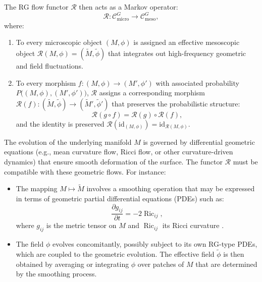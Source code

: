 The RG flow functor \(\mathcal{R}\) then acts as a Markov operator:
\[
\mathcal{R}: \mathcal{C}_{\text{micro}}^G \to \mathcal{C}_{\text{meso}}^G,
\]
where:
\begin{enumerate}[label=(\alph*)]
	\item To every microscopic object \((M, \phi)\) is assigned an effective mesoscopic object \(\mathcal{R}(M, \phi) = (\widetilde{M}, \widetilde{\phi})\) that integrates out high-frequency geometric and field fluctuations.
	\item To every morphism \(f: (M, \phi) \to (M', \phi')\) with associated probability \(P\big((M, \phi), (M', \phi')\big)\), \(\mathcal{R}\) assigns a corresponding morphism \(\mathcal{R}(f): (\widetilde{M}, \widetilde{\phi}) \to (\widetilde{M}', \widetilde{\phi}')\) that preserves the probabilistic structure:
	\[
	\mathcal{R}(g \circ f) = \mathcal{R}(g) \circ \mathcal{R}(f),
	\]
	and the identity is preserved \(\mathcal{R}(\mathrm{id}_{(M, \phi)}) = \mathrm{id}_{\mathcal{R}(M, \phi)}\).
\end{enumerate}

The evolution of the underlying manifold \(M\) is governed by differential geometric equations (e.g., mean curvature flow, Ricci flow, or other curvature-driven dynamics) that ensure smooth deformation of the surface. The functor \(\mathcal{R}\) must be compatible with these geometric flows. For instance:
\begin{itemize}
	\item The mapping \(M \mapsto \widetilde{M}\) involves a smoothing operation that may be expressed in terms of geometric partial differential equations (PDEs) such as:
	\[
	\frac{\partial g_{ij}}{\partial t} = -2 \operatorname{Ric}_{ij},
	\]
	where \(g_{ij}\) is the metric tensor on \(M\) and \(\operatorname{Ric}_{ij}\) its Ricci curvature \cite{hamilton1982three}.
	\item The field \(\phi\) evolves concomitantly, possibly subject to its own RG-type PDEs, which are coupled to the geometric evolution. The effective field \(\widetilde{\phi}\) is then obtained by averaging or integrating \(\phi\) over patches of \(M\) that are determined by the smoothing process.
\end{itemize}





\pagebreak








